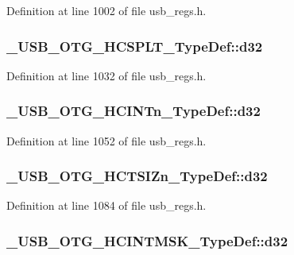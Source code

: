 Definition at line 1002 of file usb\-\_\-regs.\-h.

\hypertarget{group___u_s_b___o_t_g___d_r_i_v_e_r_ga2d653fb915c46a2e964a551de1133d6f}{
\subsubsection[{d32}]{ \-\_\-\-U\-S\-B\-\_\-\-O\-T\-G\-\_\-\-H\-C\-S\-P\-L\-T\-\_\-\-Type\-Def\-::d32}}\label{group___u_s_b___o_t_g___d_r_i_v_e_r_ga2d653fb915c46a2e964a551de1133d6f}


Definition at line 1032 of file usb\-\_\-regs.\-h.

\hypertarget{group___u_s_b___o_t_g___d_r_i_v_e_r_ga285318cfcab218b535f8a7bb06d685d1}{
\subsubsection[{d32}]{ \-\_\-\-U\-S\-B\-\_\-\-O\-T\-G\-\_\-\-H\-C\-I\-N\-Tn\-\_\-\-Type\-Def\-::d32}}\label{group___u_s_b___o_t_g___d_r_i_v_e_r_ga285318cfcab218b535f8a7bb06d685d1}


Definition at line 1052 of file usb\-\_\-regs.\-h.

\hypertarget{group___u_s_b___o_t_g___d_r_i_v_e_r_ga80c3cf6f0e0af82913acdd14390822f6}{
\subsubsection[{d32}]{ \-\_\-\-U\-S\-B\-\_\-\-O\-T\-G\-\_\-\-H\-C\-T\-S\-I\-Zn\-\_\-\-Type\-Def\-::d32}}\label{group___u_s_b___o_t_g___d_r_i_v_e_r_ga80c3cf6f0e0af82913acdd14390822f6}


Definition at line 1084 of file usb\-\_\-regs.\-h.

\hypertarget{group___u_s_b___o_t_g___d_r_i_v_e_r_gac9280aa7152575d322edde06dbdb6aa4}{
\subsubsection[{d32}]{ \-\_\-\-U\-S\-B\-\_\-\-O\-T\-G\-\_\-\-H\-C\-I\-N\-T\-M\-S\-K\-\_\-\-Type\-Def\-::d32}}\label{group___u_s_b___o_t_g___d_r_i_v_e_r_gac9280aa7152575d322edde06dbdb6aa4}



